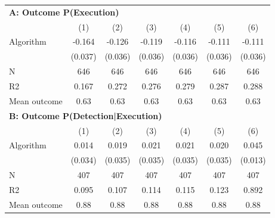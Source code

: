 \begin{tabular}{lcccccc} \toprule
\multicolumn{7}{l}{\textbf{A: Outcome P(Execution)}} \\ \multicolumn{1}{l}{} & (1) & (2) & (3) & (4) & (5) & (6) \\ \midrule
Algorithm   &      -0.164\sym{***}&      -0.126\sym{***}&      -0.119\sym{***}&      -0.116\sym{***}&      -0.111\sym{***}&      -0.111\sym{***}\\
            &     (0.037)         &     (0.036)         &     (0.036)         &     (0.036)         &     (0.036)         &     (0.036)         \\
\midrule
N           &         646         &         646         &         646         &         646         &         646         &         646         \\
R2          &       0.167         &       0.272         &       0.276         &       0.279         &       0.287         &       0.288         \\
Mean outcome&        0.63         &        0.63         &        0.63         &        0.63         &        0.63         &        0.63         \\

\midrule \multicolumn{7}{l}{\textbf{B: Outcome P(Detection|Execution)}} \\ \multicolumn{1}{l}{} & (1) & (2) & (3) & (4) & (5) & (6) \\ \midrule
Algorithm   &       0.014         &       0.019         &       0.021         &       0.021         &       0.020         &       0.045\sym{***}\\
            &     (0.034)         &     (0.035)         &     (0.035)         &     (0.035)         &     (0.035)         &     (0.013)         \\
\midrule
N           &         407         &         407         &         407         &         407         &         407         &         407         \\
R2          &       0.095         &       0.107         &       0.114         &       0.115         &       0.123         &       0.892         \\
Mean outcome&        0.88         &        0.88         &        0.88         &        0.88         &        0.88         &        0.88         \\


\end{tabular}
